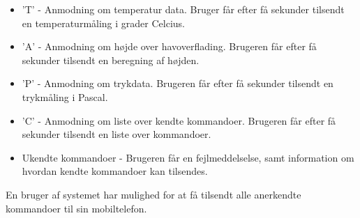 \begin{itemize}
    \item 'T' - Anmodning om temperatur data. Bruger får efter få sekunder tilsendt en temperaturmåling i grader Celcius.
    \item 'A' - Anmodning om højde over havoverflading. Brugeren får efter få sekunder tilsendt en beregning af højden.
    \item 'P' - Anmodning om trykdata. Brugeren får efter få sekunder tilsendt en trykmåling i Pascal.
    \item 'C' - Anmodning om liste over kendte kommandoer. Brugeren får efter få sekunder tilsendt en liste over kommandoer.
    \item Ukendte kommandoer - Brugeren får en fejlmeddelselse, samt information om hvordan kendte kommandoer kan tilsendes.
\end{itemize}

En bruger af systemet har mulighed for at få tilsendt alle anerkendte kommandoer til sin mobiltelefon.





